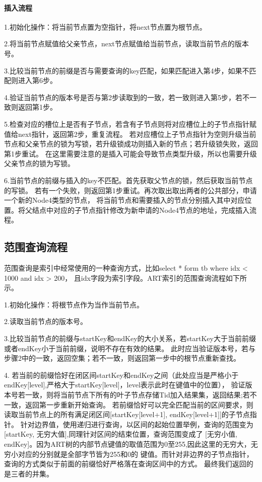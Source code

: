 \paragraph{插入流程}
1.初始化操作：将当前节点置为空指针，将next节点置为根节点。

2.将当前节点赋值给父亲节点，next节点赋值给当前节点，读取当前节点的版本号。

3.比较当前节点的前缀是否与需要查询的key匹配，如果匹配进入第4步，如果不匹配则进入第6步。

4.验证当前节点的版本号是否与第2步读取到的一致，若一致则进入第5步，若不一致则返回第1步。

5.检查对应的槽位上是否有子节点，若含有子节点则将对应槽位上的子节点指针赋值给next指针，返回第2步，重复流程。
若对应槽位上子节点指针为空则升级当前节点和父亲节点的锁为写锁，若升级锁成功则插入新的节点；若升级锁失败，返回第1步重试。
在这里需要注意的是插入可能会导致节点类型升级，所以也需要升级父亲节点的锁为写锁。

6.当前节点的前缀与插入的key不匹配。首先获取父节点的锁，然后获取当前节点的写锁。
若有一个失败，则返回第1步重试。再次取出取出两者的公共部分，申请一个新的Node4类型的节点，
将当前节点和需要插入的节点分别插入其中对应位置。将父结点中对应的子节点指针修改为新申请的Node4节点的地址，完成插入流程。

\subsection{范围查询流程}
范围查询是索引中经常使用的一种查询方式，比如select * form tb where idx < 1000 and idx > 200，
且idx字段为索引字段。ART索引的范围查询流程如下所示。

1.初始化操作：将根节点作为当作当前节点。

2.读取当前节点的版本号。

3.比较当前节点的前缀与startKey和endKey的大小关系，若startKey大于当前前缀或者endKey小于当前前缀，说明不存在有效的结果。
此时应当验证版本号，若与步骤2中的一致，返回空集；若不一致，则返回第一步中的根节点重新查找。

4. 若当前的前缀恰好在闭区间startKey和endKey之间（此处应当是严格小于endKey[level],严格大于startKey[level]，level表示此时在键值中的位置），
验证版本号若一致，则将当前节点下所有的叶子节点存储Tid加入结果集，返回结果;若不一致，返回第一步重新开始查询。
若前缀恰好可以完全匹配当前的区间要求，则读取当前节点上的所有满足闭区间[startKey[level+1], endKey[level+1]]的子节点指针。
针对边界值，使用递归进行查询，以区间的起始位置举例，查询的范围变为[startKey, 无穷大值],同理针对区间的结束位置，查询范围变成了
[无穷小值, endKey]。因为ART树的内部节点键值的取值范围为0至255,因此这里的无穷大，无穷小对应的分别就是全部字节皆为255和0的
键值。而针对非边界的子节点指针，查询的方式类似于前面的前缀恰好严格落在查询区间中的方式。
最终我们返回的是三者的并集。

